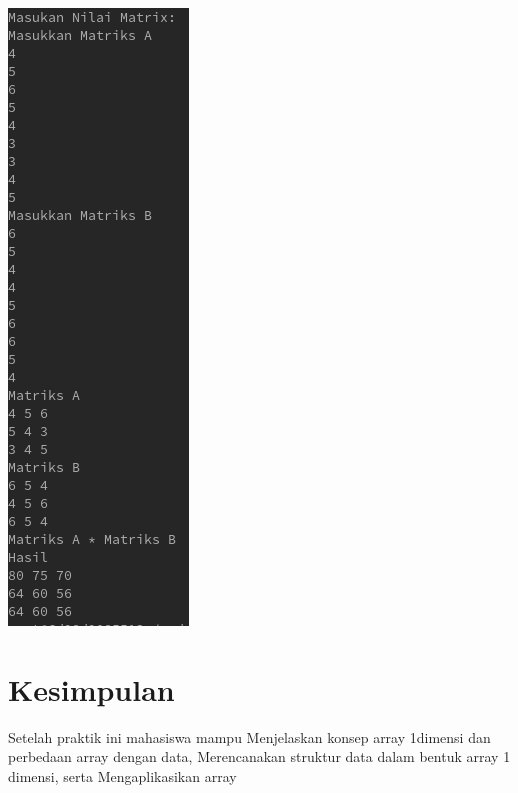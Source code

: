 \documentclass[a4paper,12pt]{article}
\begin{document}
\begin{center}
    \includegraphics[scale=.7]{8.png}
\end{center}


\newpage
\section{Kesimpulan}
Setelah praktik ini mahasiswa mampu Menjelaskan konsep array 1dimensi dan perbedaan array dengan data, Merencanakan struktur data dalam bentuk array 1 dimensi, serta
Mengaplikasikan array
\end{document}
